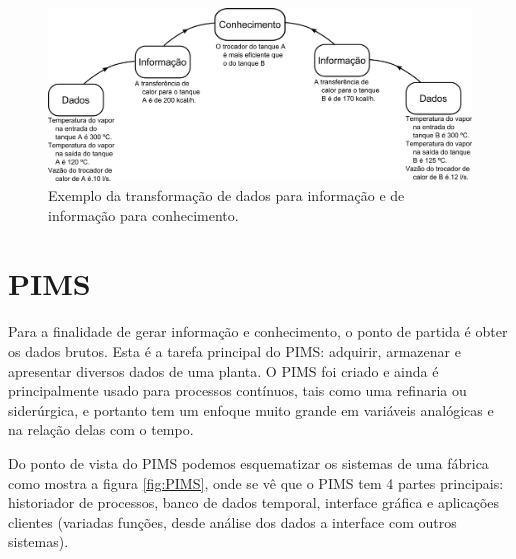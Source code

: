 \begin{figure}[htb]
	\begin{center}
		\includegraphics[width=\textwidth]{PIMS_conhecimento2}
	\end{center}
	\caption{Exemplo da transformação de dados para informação e de informação para conhecimento.}
	\label{fig:PIMS_conhecimento2}
\end{figure}

\section{PIMS}
	Para a finalidade de gerar informação e conhecimento, o ponto de partida é obter os dados brutos. Esta é a tarefa principal do PIMS: adquirir, armazenar e apresentar diversos dados de uma planta. O PIMS foi criado e ainda é principalmente usado para processos contínuos, tais como uma refinaria ou siderúrgica, e portanto tem um enfoque muito grande em variáveis analógicas e na relação delas com o tempo.

	Do ponto de vista do PIMS podemos esquematizar os sistemas de uma fábrica como mostra a figura \ref{fig:PIMS}, onde se vê que o PIMS tem 4 partes principais: historiador de processos, banco de dados temporal, interface gráfica e aplicações clientes (variadas funções, desde análise dos dados a interface com outros sistemas).

